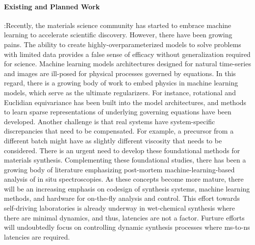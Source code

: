 \paragraph*{\textbf{Existing and Planned Work}}:Recently, the materials science community has started to embrace machine learning to accelerate scientific discovery\cite{Butler2018-qo,Schmidt2019-dz,Ramprasad2017-wp}. However, there have been growing pains. The ability to create highly-overparameterized models to solve problems with limited data provides a false sense of efficacy without generalization required for science. Machine learning models architectures designed for natural time-series and images are ill-posed for physical processes governed by equations. In this regard, there is a growing body of work to embed physics in machine learning models, which serve as the ultimate regularizers. For instance, rotational\cite{Oxley2020-hg,Kalinin2020-xl} and Euclidian equivariance\cite{Smidt_undated-oh,Smidt2020-sh} has been built into the model architectures, and methods to learn sparse representations of underlying governing equations have been developed\cite{Kaheman2020-zt,De_Silva2020-ef,Champion2019-kh}. Another challenge is that real systems have system-specific discrepancies that need to be compensated\cite{Kaheman2019-yu}. For example, a precursor from a different batch might have as slightly different viscosity that needs to be considered.  There is an urgent need to develop these foundational methods for materials synthesis. Complementing these foundational studies, there has been a growing body of literature emphasizing post-mortem machine-learning-based analysis of in situ spectroscopies\cite{Provence2020-ro,Trejo2019-ph}. As these concepts become more mature, there will be an increasing emphasis on codesign of synthesis systems, machine learning methods, and hardware for on-the-fly analysis and control. This effort towards self-driving laboratories is already underway in wet-chemical synthesis where there are minimal dynamics, and thus, latencies are not a factor\cite{MacLeod2020-mv,Langner2020-ds}. Furture efforts will undoubtedly focus on controlling dynamic synthesis processes where ms-to-ns latencies are required.

